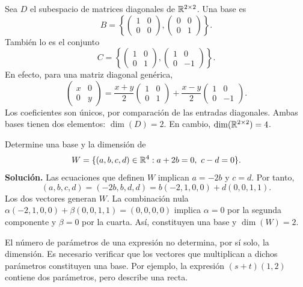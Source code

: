 \documentclass[compacto,10pt]{pubciencias-notas}
\begin{document}
\begin{ejem}
    Sea $D$ el subespacio de matrices diagonales de $\Mat[\R]{2}{2}$.
    Una base es
    \[
        B=\left\{\begin{pmatrix}1&0\\0&0\end{pmatrix},
                  \begin{pmatrix}0&0\\0&1\end{pmatrix}\right\}.
    \]
    También lo es el conjunto
    \[
        C=\left\{\begin{pmatrix}1&0\\0&1\end{pmatrix},
                  \begin{pmatrix}1&0\\0&-1\end{pmatrix}\right\}.
    \]
    En efecto, para una matriz diagonal genérica,
    \[
        \begin{pmatrix}x&0\\0&y\end{pmatrix}
        =\frac{x+y}{2}\begin{pmatrix}1&0\\0&1\end{pmatrix}
        +\frac{x-y}{2}\begin{pmatrix}1&0\\0&-1\end{pmatrix}.
    \]
    Los coeficientes son únicos, por comparación de las entradas
    diagonales. Ambas bases tienen dos elementos: $\dim(D)=2$.
    En cambio, $\dim(\Mat[\R]{2}{2})=4$.
\end{ejem}

\begin{ejem}
    Determine una base y la dimensión de
    \[
        W=\{(a,b,c,d)\in\R^4:a+2b=0,\ c-d=0\}.
    \]
    \textbf{Solución.} Las ecuaciones que definen $W$ implican
    $a=-2b$ y $c=d$. Por tanto,
    \[
        (a,b,c,d)=(-2b,b,d,d)
        =b(-2,1,0,0)+d(0,0,1,1).
    \]
    Los dos vectores generan $W$. La combinación nula
    $\alpha(-2,1,0,0)+\beta(0,0,1,1)=(0,0,0,0)$ implica
    $\alpha=0$ por la segunda componente y $\beta=0$ por la cuarta.
    Así, constituyen una base y $\dim(W)=2$.
\end{ejem}

\begin{advertencia}
    El número de parámetros de una expresión no determina, por sí solo,
    la dimensión. Es necesario verificar que los vectores que multiplican
    a dichos parámetros constituyen una base. Por ejemplo, la expresión
    $(s+t)(1,2)$ contiene dos parámetros, pero describe una recta.
\end{advertencia}
\end{document}
